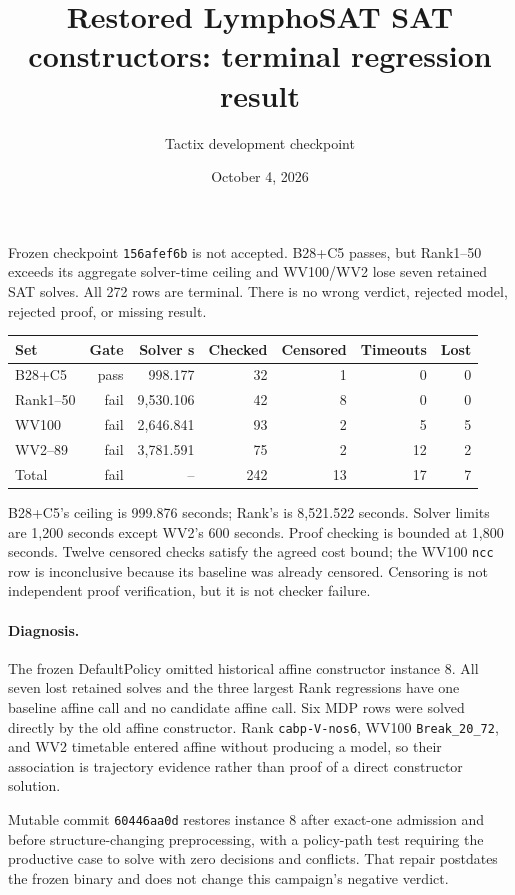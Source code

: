 \documentclass{article}
\title{Restored LymphoSAT SAT constructors: terminal regression result}
\author{Tactix development checkpoint}
\date{October 4, 2026}
\begin{document}
\sloppy
\maketitle

Frozen checkpoint \texttt{156afef6b} is not accepted.  B28+C5 passes, but
Rank1--50 exceeds its aggregate solver-time ceiling and WV100/WV2 lose seven
retained SAT solves.  All 272 rows are terminal.  There is no wrong verdict,
rejected model, rejected proof, or missing result.

\begin{center}
\begin{tabular}{lrrrrrr}
\toprule
Set & Gate & Solver s & Checked & Censored & Timeouts & Lost\\
\midrule
B28+C5 & pass & 998.177 & 32 & 1 & 0 & 0\\
Rank1--50 & fail & 9,530.106 & 42 & 8 & 0 & 0\\
WV100 & fail & 2,646.841 & 93 & 2 & 5 & 5\\
WV2--89 & fail & 3,781.591 & 75 & 2 & 12 & 2\\
\midrule
Total & fail & -- & 242 & 13 & 17 & 7\\
\bottomrule
\end{tabular}
\end{center}

B28+C5's ceiling is 999.876 seconds; Rank's is 8,521.522 seconds.  Solver
limits are 1,200 seconds except WV2's 600 seconds.  Proof checking is bounded at
1,800 seconds.  Twelve censored checks satisfy the agreed cost bound; the WV100
\texttt{ncc} row is inconclusive because its baseline was already censored.
Censoring is not independent proof verification, but it is not checker failure.

\paragraph{Diagnosis.}
The frozen DefaultPolicy omitted historical affine constructor instance 8.
All seven lost retained solves and the three largest Rank regressions have one
baseline affine call and no candidate affine call.  Six MDP rows were solved
directly by the old affine constructor.  Rank \texttt{cabp-V-nos6}, WV100
\texttt{Break\_20\_72}, and WV2 timetable entered affine without producing a
model, so their association is trajectory evidence rather than proof of a
direct constructor solution.

Mutable commit \texttt{60446aa0d} restores instance 8 after exact-one admission
and before structure-changing preprocessing, with a policy-path test requiring
the productive case to solve with zero decisions and conflicts.  That repair
postdates the frozen binary and does not change this campaign's negative
verdict.
\end{document}
